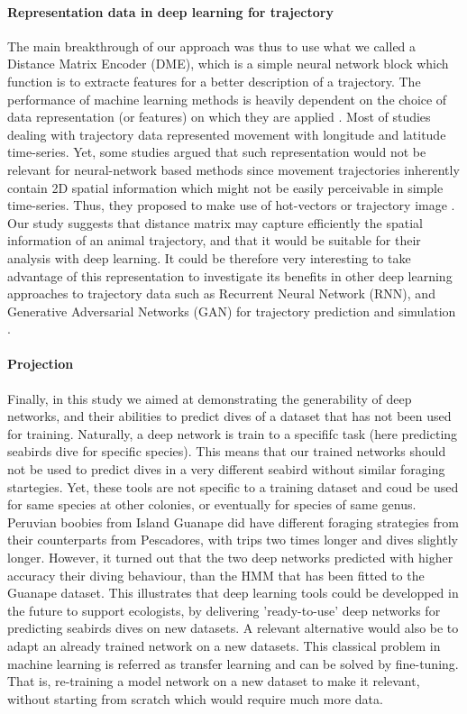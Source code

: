 \documentclass{article}
\begin{document}
\paragraph{Representation data in deep learning for trajectory}
The main breakthrough of our approach was thus to use what we called a Distance Matrix Encoder (DME), which is a simple neural network block which function is to extracte features for a better description of a trajectory.
The performance of machine learning methods is heavily dependent on the choice of data representation (or features) on which they are applied \cite{bengio_representation_2014}.
Most of studies dealing with trajectory data represented movement with longitude and latitude time-series. Yet, some studies argued that such representation would not be relevant for neural-network based methods since movement trajectories inherently contain 2D spatial information which might not be easily perceivable in simple time-series. Thus, they proposed to make use of hot-vectors \cite{nguyen_geotracknet-maritime_2021} or trajectory image \cite{endo_classifying_2016}.
Our study suggests that distance matrix may capture efficiently the spatial information of an animal trajectory, and that it would be suitable for their analysis with deep learning.
It could be therefore very interesting to take advantage of this representation to investigate its benefits in other deep learning approaches to trajectory data such as Recurrent Neural Network (RNN), and Generative Adversarial Networks (GAN) for trajectory prediction and simulation \cite{ardakani_encoding_2017,goodfellow_generative_2016,isola_image--image_2018,rew_animal_2019}.


\paragraph{Projection}
Finally, in this study we aimed at demonstrating the generability of deep networks, and their abilities to predict dives of a dataset that has not been used for training.
Naturally, a deep network is train to a specififc task (here predicting seabirds dive for specific species). This means that our trained networks should not be used to predict dives in a very different seabird without similar foraging startegies. Yet, these tools are not specific to a training dataset and coud be used for same species at other colonies, or eventually for species of same genus.
Peruvian boobies from Island Guanape did have different foraging strategies from their counterparts from Pescadores, with trips two times longer and dives slightly longer. However, it turned out that the two deep networks predicted with higher accuracy their diving behaviour, than the HMM that has been fitted to the Guanape dataset.
This illustrates that deep learning tools could be developped in the future to support ecologists, by delivering 'ready-to-use' deep networks for predicting seabirds dives on new datasets.
A relevant alternative would also be to adapt an already trained network on a new datasets. This classical problem in machine learning is referred as transfer learning and can be solved by fine-tuning. That is, re-training a model network on a new dataset to make it relevant, without starting from scratch which would require much more data.
\end{document}

